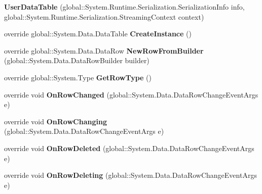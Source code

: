 \begin{DoxyCompactItemize}
\item 
{\bfseries User\+Data\+Table} (global\+::\+System.\+Runtime.\+Serialization.\+Serialization\+Info info, global\+::\+System.\+Runtime.\+Serialization.\+Streaming\+Context context)\hypertarget{class_products_1_1_data_1_1ds_sage_1_1_user_data_table_a7af1c9882f08698da221f38dfec2b27e}{}\label{class_products_1_1_data_1_1ds_sage_1_1_user_data_table_a7af1c9882f08698da221f38dfec2b27e}

\item 
override global\+::\+System.\+Data.\+Data\+Table {\bfseries Create\+Instance} ()\hypertarget{class_products_1_1_data_1_1ds_sage_1_1_user_data_table_a2c315e34c0842a64e09d6ccf67ffe5fb}{}\label{class_products_1_1_data_1_1ds_sage_1_1_user_data_table_a2c315e34c0842a64e09d6ccf67ffe5fb}

\item 
override global\+::\+System.\+Data.\+Data\+Row {\bfseries New\+Row\+From\+Builder} (global\+::\+System.\+Data.\+Data\+Row\+Builder builder)\hypertarget{class_products_1_1_data_1_1ds_sage_1_1_user_data_table_afe5e3d7cb63052f12c1a356ee49ccbd8}{}\label{class_products_1_1_data_1_1ds_sage_1_1_user_data_table_afe5e3d7cb63052f12c1a356ee49ccbd8}

\item 
override global\+::\+System.\+Type {\bfseries Get\+Row\+Type} ()\hypertarget{class_products_1_1_data_1_1ds_sage_1_1_user_data_table_aa280504f5f280073de689b800cd59630}{}\label{class_products_1_1_data_1_1ds_sage_1_1_user_data_table_aa280504f5f280073de689b800cd59630}

\item 
override void {\bfseries On\+Row\+Changed} (global\+::\+System.\+Data.\+Data\+Row\+Change\+Event\+Args e)\hypertarget{class_products_1_1_data_1_1ds_sage_1_1_user_data_table_a1264872ee037fb4792c0224934ef7834}{}\label{class_products_1_1_data_1_1ds_sage_1_1_user_data_table_a1264872ee037fb4792c0224934ef7834}

\item 
override void {\bfseries On\+Row\+Changing} (global\+::\+System.\+Data.\+Data\+Row\+Change\+Event\+Args e)\hypertarget{class_products_1_1_data_1_1ds_sage_1_1_user_data_table_a5dcad4058ab0232efc2ceb5277ae7ded}{}\label{class_products_1_1_data_1_1ds_sage_1_1_user_data_table_a5dcad4058ab0232efc2ceb5277ae7ded}

\item 
override void {\bfseries On\+Row\+Deleted} (global\+::\+System.\+Data.\+Data\+Row\+Change\+Event\+Args e)\hypertarget{class_products_1_1_data_1_1ds_sage_1_1_user_data_table_a52b267e4c178cc71f60820142cd0d5ed}{}\label{class_products_1_1_data_1_1ds_sage_1_1_user_data_table_a52b267e4c178cc71f60820142cd0d5ed}

\item 
override void {\bfseries On\+Row\+Deleting} (global\+::\+System.\+Data.\+Data\+Row\+Change\+Event\+Args e)\hypertarget{class_products_1_1_data_1_1ds_sage_1_1_user_data_table_a36bc20838a39a593b36a454dfb097c8b}{}\label{class_products_1_1_data_1_1ds_sage_1_1_user_data_table_a36bc20838a39a593b36a454dfb097c8b}

\end{DoxyCompactItemize}

